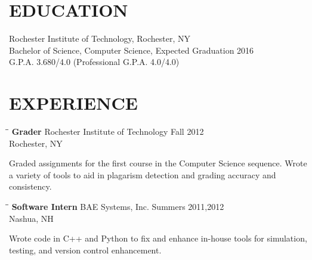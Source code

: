 \documentclass{res}
\begin{document}

\address{\bf  PRESENT ADDRESS\\
        2433 Nathaniel Rochester Hall\\
        Rochester, NY 14623\\
        (603) 204-1994}
\address{\bf PERMANENT ADDRESS\\
        1 Reeds Ferry Way\\
        Merrimack, NH 03054\\
        (604) 204-1994}

\begin{resume}

\section{EDUCATION}
    Rochester Institute of Technology, Rochester, NY  \\
    Bachelor of Science, Computer Science, Expected Graduation 2016   \\
    G.P.A. 3.680/4.0 (Professional G.P.A. 4.0/4.0)


\section{EXPERIENCE}
   \vspace{-0.1in}

   \begin{tabbing}
   \hspace{2.3in}\= \hspace{2.6in}\= \kill %
    {\bf Grader} \>Rochester Institute of Technology     \>Fall 2012\\
                 \>Rochester, NY
   \end{tabbing}\vspace{-20pt}      %
    Graded assignments for the first course in the Computer Science sequence.
    Wrote a variety of tools to aid in plagarism detection and grading accuracy and consistency.

   \begin{tabbing}
   \hspace{2.3in}\= \hspace{2.6in}\= \kill %
    {\bf Software Intern} \>BAE Systems, Inc.     \>Summers 2011,2012\\
                          \>Nashua, NH
   \end{tabbing}\vspace{-20pt}      %
    Wrote code in C++ and Python to fix and enhance in-house tools
    for simulation, testing, and version control enhancement.


\end{resume}
\end{document}
